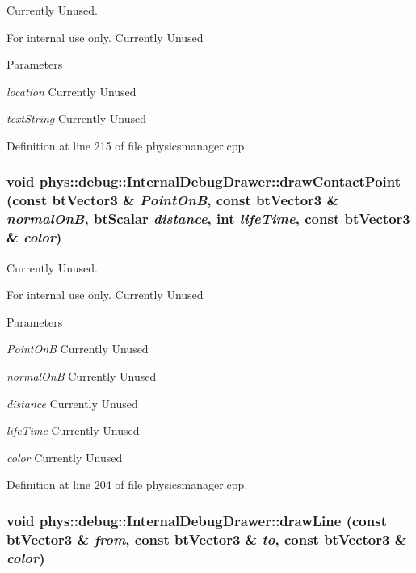 Currently Unused. 

\begin{DoxyInternal}{For internal use only.}
Currently Unused 
\begin{DoxyParams}{Parameters}
\item[{\em location}]Currently Unused \item[{\em textString}]Currently Unused \end{DoxyParams}
\end{DoxyInternal}


Definition at line 215 of file physicsmanager.cpp.

\hypertarget{classphys_1_1debug_1_1InternalDebugDrawer_a8b912aaff8dfd9f4e97ffb2d867121b2}{
\subsubsection[{drawContactPoint}]{\setlength{\rightskip}{0pt plus 5cm}void phys::debug::InternalDebugDrawer::drawContactPoint (const btVector3 \& {\em PointOnB}, \/  const btVector3 \& {\em normalOnB}, \/  btScalar {\em distance}, \/  int {\em lifeTime}, \/  const btVector3 \& {\em color})}}
\label{db/d27/classphys_1_1debug_1_1InternalDebugDrawer_a8b912aaff8dfd9f4e97ffb2d867121b2}


Currently Unused. 

\begin{DoxyInternal}{For internal use only.}
Currently Unused 
\begin{DoxyParams}{Parameters}
\item[{\em PointOnB}]Currently Unused \item[{\em normalOnB}]Currently Unused \item[{\em distance}]Currently Unused \item[{\em lifeTime}]Currently Unused \item[{\em color}]Currently Unused \end{DoxyParams}
\end{DoxyInternal}


Definition at line 204 of file physicsmanager.cpp.

\hypertarget{classphys_1_1debug_1_1InternalDebugDrawer_a8a35c3c80fddaaec8e21f737ed1b3938}{
\subsubsection[{drawLine}]{\setlength{\rightskip}{0pt plus 5cm}void phys::debug::InternalDebugDrawer::drawLine (const btVector3 \& {\em from}, \/  const btVector3 \& {\em to}, \/  const btVector3 \& {\em color})}}
\label{db/d27/classphys_1_1debug_1_1InternalDebugDrawer_a8a35c3c80fddaaec8e21f737ed1b3938}


